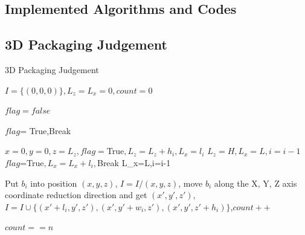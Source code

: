 \documentclass{mcmthesis}
\begin{document}
\begin{appendices}







\section{Implemented Algorithms and Codes}
\subsection{3D Packaging Judgement}
\begin{algorithm}  
  \caption{3D Packaging Judgement}  
  $I=\{(0,0,0)\}, L_z = L_x = 0,count=0$\;
  {  
    $flag = false$\;
    {
        {
            $flag$= True,Break\;
        }
        {
            {
                {
                    $x=0,y=0,z=L_z,flag=$True$,L_z=L_z+h_i,L_x=l_i$\;
                }
                {
                    $L_z=H,L_x=L,i=i-1$\;
                }
            }
            \Else
            {
                {
                    {
                        $flag$=True$,L_x=L_x+l_i,$Break\;
                    }
                }
                {
                    L_x=L,i=i-1\;
                }
            }
            
        }
        {
            Put $b_i$ into position $(x,y,z)$, $I=I/{(x,y,z)}$, move $b_i$ along the X, Y, Z axis coordinate reduction direction and get $(x',y',z')$, $I=I\cup \{(x'+l_i,y',z'),(x',y'+w_i,z'),(x',y',z'+h_i)\}$,$count++$ 
        }
    }
  }
\Return $count==n$\;  
\end{algorithm}  



\end{appendices}
\end{document}

